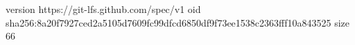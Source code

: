version https://git-lfs.github.com/spec/v1
oid sha256:8a20f7927ced2a5105d7609fc99dfcd6850df9f73ee1538c2363fff10a843525
size 66
